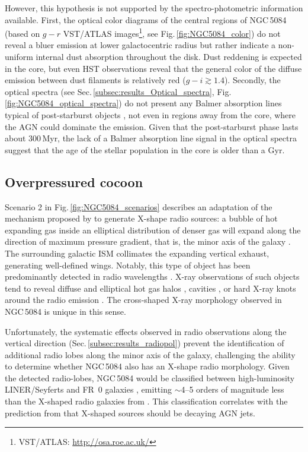 \documentclass[modern]{CORE-AAS/aastex631}
\begin{document}
{However, this hypothesis is not supported by the spectro-photometric information available. First, the optical color diagrams of the central regions of NGC\,5084 (based on $g-r$ VST/ATLAS images\footnote{VST/ATLAS: \url{http://osa.roe.ac.uk/}}, see Fig.\,\ref{fig:NGC5084_color}) do not reveal a bluer emission at lower galactocentric radius but rather indicate a non-uniform internal dust absorption throughout the disk. Dust reddening is expected in the core, but even HST observations reveal that the general color of the diffuse emission between dust filaments is relatively red ($g-i\gtrsim1.4$).
Secondly, the optical spectra (see Sec.\,\ref{subsec:results_Optical_spectra}, Fig.\,\ref{fig:NGC5084_optical_spectra}) do not present any Balmer absorption lines typical of post-starburst objects \citep[also called E+A or K+A galaxies,][]{dressler+1983apj270_7}, not even in regions away from the core, where the AGN could dominate the emission. Given that the post-starburst phase lasts about 300\,Myr, the lack of a Balmer absorption line signal in the optical spectra suggest that the age of the stellar population in the core is older than a Gyr. 


\subsection{Overpressured cocoon}
\label{subsec:discussion_cocoon}

Scenario 2 in Fig.\,\ref{fig:NGC5084_scenarios} describes an adaptation of the mechanism proposed by \citet{capetti+2002aap394_39} to generate X-shape radio sources: a bubble of hot expanding gas inside an elliptical distribution of denser gas will expand along the direction of maximum pressure gradient, that is, the minor axis of the galaxy  \citep{blandford+1974mnras169_395}. The surrounding galactic ISM collimates the expanding vertical exhaust, generating well-defined wings. Notably, this type of object has been predominantly detected in radio wavelengths \citep[X-shaped radio galaxies,][]{hodgeskluck2011thesis, giri+2024sci11_1371101}.  X-ray observations of such objects tend to reveal diffuse and elliptical hot gas halos \citep{hodgeskluck+2010apj710_1205}, cavities \citep{hodgeskluck+2010apj717_37}, or hard X-ray knots around the radio emission \citep{hodgeskluck+2012apj746_167}. The cross-shaped X-ray morphology observed in NGC\,5084 is unique in this sense. 

Unfortunately, the systematic effects observed in radio observations along the vertical direction (Sec.\,\ref{subsec:results_radiopol}) prevent the identification of additional radio lobes along the minor axis of the galaxy, challenging the ability to determine whether NGC\,5084 also has an X-shape radio morphology. Given the detected radio-lobes, NGC\,5084 would be classified between high-luminosity LINER/Seyferts and FR~0 galaxies \citep[see Table \ref{tab:Radio_Lobes},][]{baldi2023aap31_3}, emitting $\sim$4--5 orders of magnitude less than the X-shaped radio galaxies from \citet{cheung+2009apj181_548}. This classification correlates with the prediction from \citet{hodgeskluck2011thesis} that X-shaped sources should be decaying AGN jets. 



}
\end{document}
